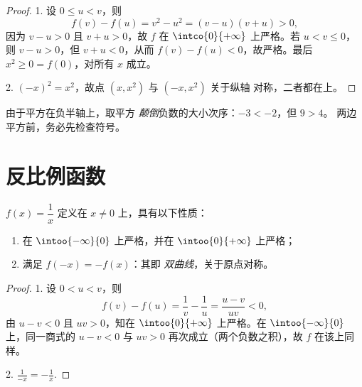 \begin{proof}
1. 设 $0 \leq u < v$，则
\[
f(v) - f(u) = v^2 - u^2 = (v - u)(v + u) > 0,
\]
因为 $v - u > 0$ 且 $v + u > 0$，故 $f$ 在
$\intco{0}{+\infty}$ 上严格。若 $u < v \leq 0$，则 $v - u > 0$，但
$v + u < 0$，从而 $f(v) - f(u) < 0$，故严格。最后
$x^2 \geq 0 = f(0)$，对所有 $x$ 成立。

2. $(-x)^2 = x^2$，故点 $(x, x^2)$ 与 $(-x, x^2)$ 关于纵轴
对称，二者都在上。
\end{proof}

\begin{remark}[平方与大小关系]
由于平方在负半轴上，取平方
\emph{颠倒}负数的大小次序：$-3 < -2$，但 $9 > 4$。
两边平方前，务必先检查符号。
\end{remark}

\section{反比例函数}

\begin{proposition}[反比例函数]\label{prop:g10:reffunc:inverse}
 $f(x) = \dfrac1x$ 定义在 $x \neq 0$ 上，具有以下性质：
\begin{enumerate}
  \item 在 $\intoo{-\infty}{0}$ 上严格，并在
        $\intoo{0}{+\infty}$ 上严格；
  \item 满足 $f(-x) = -f(x)$：其即
        \emph{双曲线}，关于原点对称。
\end{enumerate}
\end{proposition}

\begin{proof}
1. 设 $0 < u < v$，则
\[
f(v) - f(u) = \frac1v - \frac1u = \frac{u - v}{uv} < 0,
\]
由 $u - v < 0$ 且 $uv > 0$，知在
$\intoo{0}{+\infty}$ 上严格。在 $\intoo{-\infty}{0}$ 上，同一商式的
$u - v < 0$ 与 $uv > 0$ 再次成立（两个负数之积），故 $f$
在该上同样。

2. $\frac{1}{-x} = -\frac1x$.
\end{proof}

